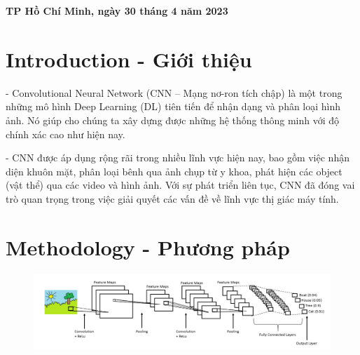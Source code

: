 \documentclass[12pt, a4paper]{article}
\begin{document}
\vspace{80px}

\begin{center}
    

\fontsize{13}{17}\selectfont
\color{black}\textbf{TP Hồ Chí Minh, ngày 30 tháng 4 năm 2023}


\end{center}

\color{black}


\newpage
\begin{center}
\tableofcontents
\end{center}

\newpage
\section{Introduction - Giới thiệu}
\par \hspace{1cm}- Convolutional Neural Network (CNN – Mạng nơ-ron tích chập) là một trong những mô hình Deep Learning (DL) tiên tiến để nhận dạng và phân loại hình ảnh. Nó giúp cho chúng ta xây dựng được những hệ thống thông minh với độ chính xác cao như hiện nay.
\par \hspace{1cm}- CNN được áp dụng rộng rãi trong nhiều lĩnh vực hiện nay, bao gồm việc nhận diện khuôn mặt, phân loại bênh qua ảnh chụp từ y khoa, phát hiện các object (vật thể) qua các video và hình ảnh. Với sự phát triển liên tục, CNN đã đóng vai trò quan trọng trong việc giải quyết các vấn đề về lĩnh vực thị giác máy tính.
\section{Methodology - Phương pháp}
\begin{figure}[h] %
    \centering
    \includegraphics[scale = 0.67]{Img/cnn2.png}
\end{figure}
\end{document}
